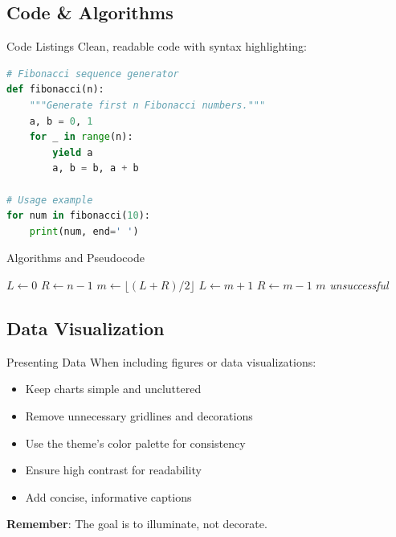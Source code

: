 \documentclass[aspectratio=169]{beamer}
\begin{document}
\subsection{Code \& Algorithms}

\begin{frame}[fragile]{Code Listings}
  Clean, readable code with syntax highlighting:

  \vspace{0.5em}

  \begin{lstlisting}[language=Python]
# Fibonacci sequence generator
def fibonacci(n):
    """Generate first n Fibonacci numbers."""
    a, b = 0, 1
    for _ in range(n):
        yield a
        a, b = b, a + b

# Usage example
for num in fibonacci(10):
    print(num, end=' ')
  \end{lstlisting}
\end{frame}

\begin{frame}{Algorithms and Pseudocode}

  \begin{algorithm}[H]
    \small
    \caption{Binary Search}
    \begin{algorithmic}[1]
        \State $L \gets 0$
        \State $R \gets n - 1$
          \State $m \gets \lfloor (L + R)/2 \rfloor$
            \State $L \gets m + 1$
            \State $R \gets m - 1$
          \Else
            \State \Return $m$
          \EndIf
        \EndWhile
        \State \Return \textit{unsuccessful}
      \EndProcedure
    \end{algorithmic}
  \end{algorithm}
\end{frame}

\subsection{Data Visualization}

\begin{frame}{Presenting Data}
  When including figures or data visualizations:

  \begin{itemize}
    \item Keep charts simple and uncluttered
    \item Remove unnecessary gridlines and decorations
    \item Use the theme's color palette for consistency
    \item Ensure high contrast for readability
    \item Add concise, informative captions
  \end{itemize}

  \vspace{1em}

  \textbf{Remember}: The goal is to illuminate, not decorate.
\end{frame}
\end{document}
